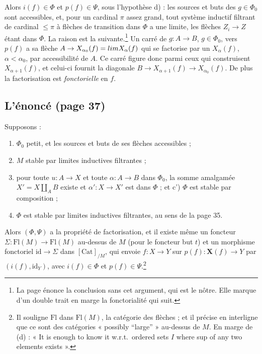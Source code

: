 \documentclass[11pt,a4paper]{article}
\begin{document}
Alors $i(f) \in \Phi$ et $p(f) \in \Psi$, sous l'hypothèse d) : les sources et
buts des $g \in \Phi_0$ sont accessibles, et, pour un cardinal $\pi$ assez
grand, tout système inductif filtrant de cardinal $\leqslant \pi$ à flèches de
transition dans $\Phi$ a une limite, les flèches $Z_i \to Z$ étant dans
$\Phi$. La raison est la suivante.\footnote{La page énonce la conclusion sans
cet argument, qui est le nôtre. Elle marque d'un double trait en marge la
fonctorialité qui suit.} Un carré de $g : A \to B$, $g \in \Phi_0$, vers
$p(f)$ a sa flèche $A \to X_{\alpha_0}(f) = \varinjlim X_\alpha(f)$ qui se
factorise par un $X_\alpha(f)$, $\alpha < \alpha_0$, par accessibilité de $A$.
Ce carré figure donc parmi ceux qui construisent $X_{\alpha+1}(f)$, et celui-ci
fournit la diagonale $B \to X_{\alpha+1}(f) \to X_{\alpha_0}(f)$. De plus la
factorisation est \emph{fonctorielle} en $f$.

\subsection*{L'énoncé (page 37)}

Supposons :
\begin{enumerate}
\item[a)] $\Phi_0$ petit, et les sources et buts de ses flèches accessibles ;
\item[b)] $M$ stable par limites inductives filtrantes ;
\item[(c)] pour toute $u : A \to X$ et toute $\alpha : A \to B$ dans $\Phi_0$,
la somme amalgamée $X' = X \amalg_A B$ existe et $\alpha' : X \to X'$ est
dans $\Phi$ ; et c') $\Phi$ est stable par composition ;
\item[(d)] $\Phi$ est stable par limites inductives filtrantes, au sens de la
page 35.
\end{enumerate}
Alors $(\Phi, \Psi)$ a la propriété de factorisation, et il existe même un
foncteur $\Sigma : \mathrm{Fl}(M) \to \mathrm{Fl}(M)$ au-dessus de $M$ (pour le
foncteur but $t$) et un morphisme fonctoriel $\mathrm{id} \to \Sigma$ dans
$[\mathrm{Cat}]_{/M}$, qui envoie $f : X \to Y$ sur $p(f) :
\mathbf{X}(f) \to Y$ par $(i(f), \mathrm{id}_Y)$, avec $i(f) \in \Phi$ et
$p(f) \in \Psi$.\footnote{Il souligne $\mathrm{Fl}$ dans
$\mathrm{Fl}(M)$, la catégorie des flèches ; et il précise en
interligne que ce sont des catégories « possibly “large” » au-dessus de
$M$. En marge de (d) : « It is enough to know it w.r.t.\ ordered sets $I$ where
sup of any two elements exists ».}
\end{document}
